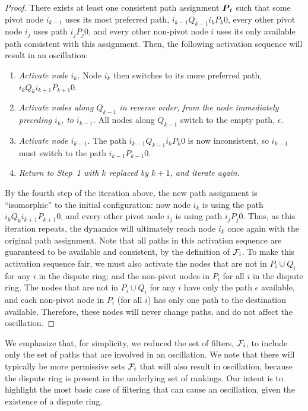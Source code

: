 \begin{proof}
There exists at least one consistent path assignment $\boldsymbol{P}_t$ such
that some pivot node $i_{k-1}$ uses its most preferred path,
$i_{k-1} Q_{k-1} i_k P_{k} 0$, every other pivot node $i_j$ uses
path $i_j P_{j} 0$, and every other non-pivot node $i$ uses
its only available path consistent with this assignment.  Then, the
following activation sequence will result in an oscillation:
\begin{enumerate}
\itemsep=-1pt
\item {\em Activate node $i_k$.}  Node $i_k$ then switches to its more
  preferred path, $i_k Q_{k} i_{k+1} P_{k+1} 0$.  
\item {\em Activate nodes along $Q_{k-1}$ in reverse order, from
the node immediately preceding $i_{k}$, to $i_{k-1}$.}  All nodes
  along $Q_{k-1}$ switch to the empty path, $\epsilon$.
\item {\em Activate node $i_{k-1}$.}  The path $i_{k-1} Q_{k-1} i_k P_{k}
  0$ is now inconsistent, so $i_{k-1}$ must switch to the path $i_{k-1} P_{k-1} 0$.
\item {\em Return to Step~1 with $k$ replaced by $k+1$, and iterate again.}
\end{enumerate}
By the fourth step of the iteration above, the new path assignment is
``isomorphic'' to the initial configuration: now node $i_k$ is using
the path $i_k Q_k i_{k+1} P_{k+1} 0$, and every other pivot node $i_j$ is
using path $i_j P_j 0$.  Thus, as this iteration repeats, the
dynamics will ultimately reach node $i_k$ once again with the
original path assignment.  Note that all paths in this activation
sequence are guaranteed to be available and consistent, by the
definition of $\mathcal{F}_i$.
%
To make this activation sequence fair, we must also activate the
nodes that are not in $P_{i} \cup Q_{i}$ for any $i$ in the dispute
ring; and the non-pivot nodes in $P_i$ for all $i$ in the dispute ring.  The
nodes that are not in $P_{i} \cup Q_{i}$ for any $i$ have only the path
$\epsilon$ available, and each non-pivot node in $P_i$ (for all $i$) has
only one 
path to the destination available. Therefore, these nodes will never
change paths, and do not affect the oscillation.
\end{proof}

We emphasize that, for simplicity, we reduced the set of filters,
$\mathcal{F}_i$, to include 
only the set of paths that are involved in an oscillation.  We note
that there will typically be more permissive sets $\mathcal{F}_i$ that will
also result in oscillation, because the dispute ring is present in the
underlying set of rankings.  Our intent is to highlight the
most basic case of filtering that can cause an oscillation, given the
existence of a dispute ring.


